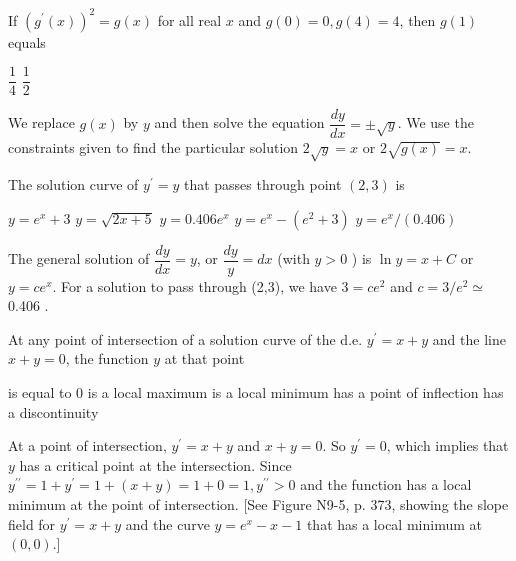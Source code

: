 \newpage



\question
If $\left(g^{\prime}(x)\right)^{2}=g(x)$ for all real $x$ and $g(0)=0, g(4)=4$, then $g(1)$ equals
\begin{choices}
  \CorrectChoice $\dfrac{1}{4}$
  \choice $\dfrac{1}{2}$
\end{choices}
\begin{solution}
We replace $g(x)$ by $y$ and then solve the equation $\dfrac{d y}{d x}= \pm \sqrt{y}$. We use the constraints given to find the particular solution $2 \sqrt{y}=x$ or $2 \sqrt{g(x)}=x$.
\end{solution}

\question
The solution curve of $y^{\prime}=y$ that passes through point $(2,3)$ is
\begin{choices}
  \choice $y=e^{x}+3$
  \choice $y=\sqrt{2 x+5}$
  \CorrectChoice $y=0.406 e^{x}$
  \choice $y=e^{x}-\left(e^{2}+3\right)$
  \choice $y=e^{x} /(0.406)$
\end{choices}
\begin{solution}
The general solution of $\dfrac{d y}{d x}=y$, or $\dfrac{d y}{y}=d x$ (with $y>0$ ) is $\ln y=x+C$ or $y=c e^{x}$. For a solution to pass through (2,3), we have $3=c e^{2}$ and $c=3 / e^{2} \simeq$ 0.406 .
\end{solution}

\question
At any point of intersection of a solution curve of the d.e. $y^{\prime}=x+y$ and the line $x+y=0$, the function $y$ at that point
\begin{choices}
  \choice is equal to 0
  \choice is a local maximum
  \CorrectChoice is a local minimum
  \choice has a point of inflection
  \choice has a discontinuity
\end{choices}
\begin{solution}
At a point of intersection, $y^{\prime}=x+y$ and $x+y=0$. So $y^{\prime}=0$, which implies that $y$ has a critical point at the intersection. Since $y^{\prime \prime}=1+y^{\prime}= 1+(x+y)=1+0=1, y^{\prime \prime}>0$ and the function has a local minimum at the point of intersection. [See Figure N9-5, p. 373, showing the slope field for $y^{\prime}=x+y$ and the curve $y=e^{x}-x-1$ that has a local minimum at $(0,0)$.]
\end{solution}




\newpage



